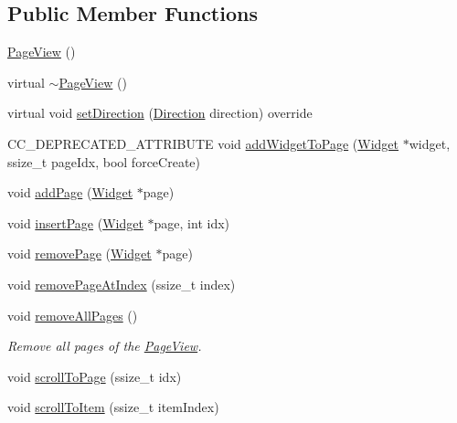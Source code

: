 \subsection*{Public Member Functions}
\begin{DoxyCompactItemize}
\item 
\hyperlink{classui_1_1PageView_a5b0ef1346c9a4c504162111bd668a826}{Page\+View} ()
\item 
virtual \hyperlink{classui_1_1PageView_aa52ebe43969bffeb70308a601ce371d0}{$\sim$\+Page\+View} ()
\item 
virtual void \hyperlink{classui_1_1PageView_a594124394d2bc1dff86069b87939b14c}{set\+Direction} (\hyperlink{classui_1_1ScrollView_aed2d778ae8098dcafe323b2beae8dd6b}{Direction} direction) override
\item 
C\+C\+\_\+\+D\+E\+P\+R\+E\+C\+A\+T\+E\+D\+\_\+\+A\+T\+T\+R\+I\+B\+U\+TE void \hyperlink{classui_1_1PageView_a03a31ed8613f6e10b3b3349ca8fbbe66}{add\+Widget\+To\+Page} (\hyperlink{classui_1_1Widget}{Widget} $\ast$widget, ssize\+\_\+t page\+Idx, bool force\+Create)
\item 
void \hyperlink{classui_1_1PageView_afc6dc3519137860e93f4e777dc172874}{add\+Page} (\hyperlink{classui_1_1Widget}{Widget} $\ast$page)
\item 
void \hyperlink{classui_1_1PageView_ae1909f7baa4a2e38f1a90f24c428db2d}{insert\+Page} (\hyperlink{classui_1_1Widget}{Widget} $\ast$page, int idx)
\item 
void \hyperlink{classui_1_1PageView_afc0653451f8a57c9cb2f7b14eabe1c1f}{remove\+Page} (\hyperlink{classui_1_1Widget}{Widget} $\ast$page)
\item 
void \hyperlink{classui_1_1PageView_a58351bb2e6b271b846b56db3a5ae302b}{remove\+Page\+At\+Index} (ssize\+\_\+t index)
\item 
\mbox{\label{classui_1_1PageView_a8132e1b393db7c6f24d66f31d51533e7}} 
void \hyperlink{classui_1_1PageView_a8132e1b393db7c6f24d66f31d51533e7}{remove\+All\+Pages} ()
\begin{DoxyCompactList}\small\item\em Remove all pages of the \hyperlink{classui_1_1PageView}{Page\+View}. \end{DoxyCompactList}\item 
void \hyperlink{classui_1_1PageView_a054f9005201643dfb457965f26bf3625}{scroll\+To\+Page} (ssize\+\_\+t idx)
\item 
void \hyperlink{classui_1_1PageView_ad0c9adc302818366c639e6425f4da898}{scroll\+To\+Item} (ssize\+\_\+t item\+Index)

\end{DoxyCompactItemize}
